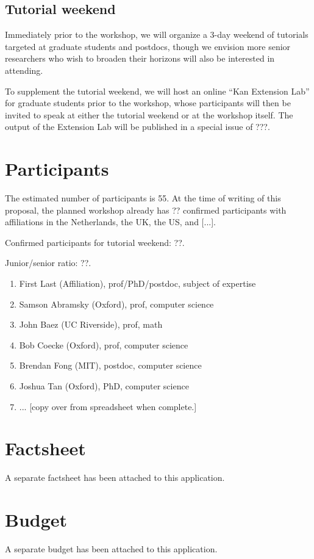 \documentclass{article}
\newcommand{\redout}[1]{{\color{red}#1}}
\begin{document}

\subsection{Tutorial weekend}
Immediately prior to the workshop, we will organize a 3-day weekend of tutorials targeted at graduate students and postdocs, though we envision more senior researchers who wish to broaden their horizons will also be interested in attending.

To supplement the tutorial weekend, we will host an online ``Kan Extension Lab'' for graduate students prior to the workshop, whose participants will then be invited to speak at either the tutorial weekend or at the workshop itself. The output of the Extension Lab will be published in a special issue of \redout{???}.

\section{Participants}
The estimated number of participants is 55. At the time of writing of this proposal, the planned workshop already has ?? confirmed participants with affiliations in the Netherlands, the UK, the US, and [...].

Confirmed participants for tutorial weekend: ??. 

Junior/senior ratio: ??.

\begin{enumerate}
\item First Last (Affiliation), prof/PhD/postdoc, subject of expertise
\item Samson Abramsky (Oxford), prof, computer science
\item John Baez (UC Riverside), prof, math
\item Bob Coecke (Oxford), prof, computer science
\item Brendan Fong (MIT), postdoc, computer science
\item Joshua Tan (Oxford), PhD, computer science
\item ... [copy over from spreadsheet when complete.]
\end{enumerate}

\section{Factsheet}
A separate factsheet has been attached to this application.

\section{Budget}
A separate budget has been attached to this application.
\end{document}
